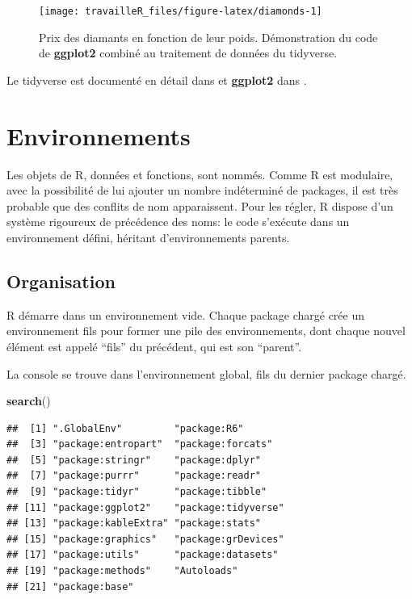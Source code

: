 \documentclass[
  12pt,
  french,
  a4paper,
  extrafontsizes,onecolumn,openright
  ]{memoir}
\newenvironment{Shaded}{\begin{snugshade}}{\end{snugshade}}
\newcommand{\KeywordTok}[1]{\textcolor[rgb]{0.13,0.29,0.53}{\textbf{#1}}}
\newcommand{\NormalTok}[1]{#1}
\begin{document}
\begin{figure}

{\centering \texttt{[image: travailleR\_files/figure-latex/diamonds-1]} 

}

\caption{Prix des diamants en fonction de leur poids. Démonstration du code de \textbf{ggplot2} combiné au traitement de données du tidyverse.}\label{fig:diamonds}
\end{figure}

\normalsize

Le tidyverse est documenté en détail dans \textcite{Wickham2016} et \textbf{ggplot2} dans \textcite{Wickham2017}.

\hypertarget{sec:environnements}{%
\section{Environnements}\label{sec:environnements}}

Les objets de R, données et fonctions, sont nommés.
Comme R est modulaire, avec la possibilité de lui ajouter un nombre indéterminé de packages, il est très probable que des conflits de nom apparaissent.
Pour les régler, R dispose d'un système rigoureux de précédence des noms: le code s'exécute dans un environnement défini, héritant d'environnements parents.

\hypertarget{organisation}{%
\subsection{Organisation}\label{organisation}}

R démarre dans un environnement vide.
Chaque package chargé crée un environnement fils pour former une pile des environnements, dont chaque nouvel élément est appelé \enquote{fils} du précédent, qui est son \enquote{parent}.

La console se trouve dans l'environnement global, fils du dernier package chargé.

\scriptsize

\begin{Shaded}
\begin{Highlighting}[]
\KeywordTok{search}\NormalTok{()}
\end{Highlighting}
\end{Shaded}

\begin{verbatim}
##  [1] ".GlobalEnv"         "package:R6"        
##  [3] "package:entropart"  "package:forcats"   
##  [5] "package:stringr"    "package:dplyr"     
##  [7] "package:purrr"      "package:readr"     
##  [9] "package:tidyr"      "package:tibble"    
## [11] "package:ggplot2"    "package:tidyverse" 
## [13] "package:kableExtra" "package:stats"     
## [15] "package:graphics"   "package:grDevices" 
## [17] "package:utils"      "package:datasets"  
## [19] "package:methods"    "Autoloads"         
## [21] "package:base"
\end{verbatim}
\end{document}
